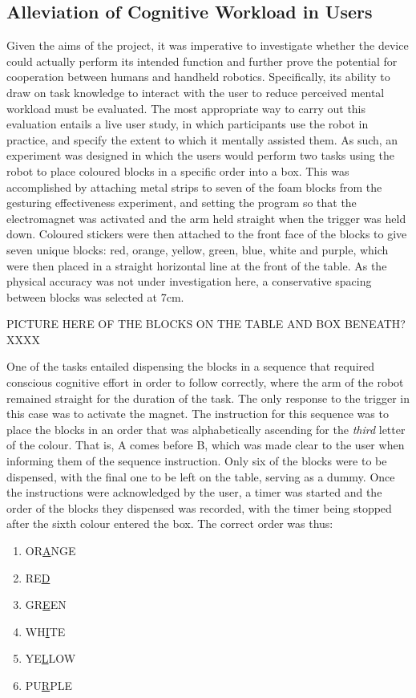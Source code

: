 \documentclass[11pt]{article}
\begin{document}
\subsection{Alleviation of Cognitive Workload in Users}

Given the aims of the project, it was imperative to investigate whether the device could actually perform its intended function and further prove the potential for cooperation between humans and handheld robotics. Specifically, its ability to draw on task knowledge to interact with the user to reduce perceived mental workload must be evaluated. The most appropriate way to carry out this evaluation entails a live user study, in which participants use the robot in practice, and specify the extent to which it mentally assisted them. As such, an experiment was designed in which the users would perform two tasks using the robot to place coloured blocks in a specific order into a box. This was accomplished by attaching metal strips to seven of the foam blocks from the gesturing effectiveness experiment, and setting the program so that the electromagnet was activated and the arm held straight when the trigger was held down. Coloured stickers were then attached to the front face of the blocks to give seven unique blocks: red, orange, yellow, green, blue, white and purple, which were then placed in a straight horizontal line at the front of the table. As the physical accuracy was not under investigation here, a conservative spacing between blocks was selected at 7cm.

PICTURE HERE OF THE BLOCKS ON THE TABLE AND BOX BENEATH? XXXX

One of the tasks entailed dispensing the blocks in a sequence that required conscious cognitive effort in order to follow correctly, where the arm of the robot remained straight for the duration of the task. The only response to the trigger in this case was to activate the magnet. The instruction for this sequence was to place the blocks in an order that was alphabetically ascending for the \textit{third} letter of the colour. That is, A comes before B, which was made clear to the user when informing them of the sequence instruction. Only six of the blocks were to be dispensed, with the final one to be left on the table, serving as a dummy. Once the instructions were acknowledged by the user, a timer was started and the order of the blocks they dispensed was recorded, with the timer being stopped after the sixth colour entered the box. The correct order was thus:
\begin{enumerate}
\item{OR\underline{A}NGE}
\item{RE\underline{D}}
\item{GR\underline{E}EN}
\item{WH\underline{I}TE}
\item{YE\underline{L}LOW}
\item{PU\underline{R}PLE}
\end{enumerate}
\end{document}
